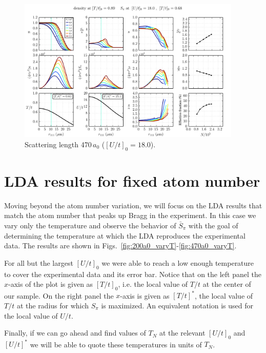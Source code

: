 \documentclass[11pt,letter]{article}
\begin{document}
\begin{figure}[H]
    \centering
\includegraphics[width=0.95\textwidth]{figures/470a0_hot.png}
\caption{Scattering length 470\,$a_{0}$ ($[U/t]_{0}=18.0$).   } 
\label{fig:470a0_varyNhot}
\end{figure} 


\section{ LDA results for fixed atom number }  

Moving beyond the atom number variation,  we will focus on the LDA results
that match the atom number that peaks up Bragg in the experiment.  In this
case we vary only the temperature and observe the behavior of $\bar{S}_{\pi}$
with the goal of determining the temperature at which the LDA reproduces the
experimental data.   The results are shown in
Figs.~\ref{fig:200a0_varyT}-\ref{fig:470a0_varyT}.  

For all but the largest $[U/t]_{0}$ we were able to reach a low enough
temperature to cover the experimental data and its error bar.    Notice that
on the left panel the $x$-axis of the plot is given as $[T/t]_{0}$,  i.e.
the local value of $T/t$ at the center of our sample.   On the right panel
the $x$-axis is given as $[T/t]^{*}$,  the local value of $T/t$ at the radius
for which $S_{\pi}$ is maximized.   An equivalent notation is used for the
local value of $U/t$. 

Finally, if we can go ahead and find values of $T_{N}$ at the relevant
$[U/t]_{0}$  and $[U/t]^{*}$ we will be able to  quote these temperatures in
units of $T_{N}$.  
\end{document}
